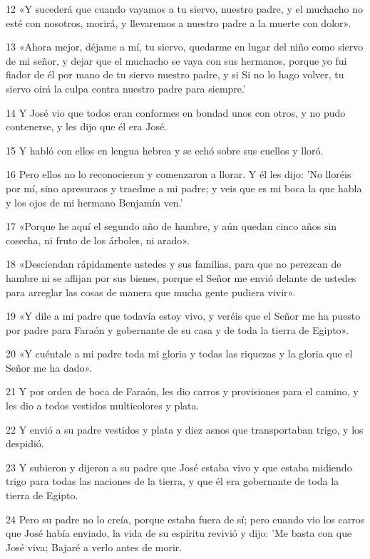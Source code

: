 \par 12 «Y sucederá que cuando vayamos a tu siervo, nuestro padre, y el muchacho no esté con nosotros, morirá, y llevaremos a nuestro padre a la muerte con dolor».
\par 13 «Ahora mejor, déjame a mí, tu siervo, quedarme en lugar del niño como siervo de mi señor, y dejar que el muchacho se vaya con sus hermanos, porque yo fui fiador de él por mano de tu siervo nuestro padre, y si Si no lo hago volver, tu siervo oirá la culpa contra nuestro padre para siempre.'
\par 14 Y José vio que todos eran conformes en bondad unos con otros, y no pudo contenerse, y les dijo que él era José.
\par 15 Y habló con ellos en lengua hebrea y se echó sobre sus cuellos y lloró.
\par 16 Pero ellos no lo reconocieron y comenzaron a llorar. Y él les dijo: 'No lloréis por mí, sino apresuraos y traedme a mi padre; y veis que es mi boca la que habla y los ojos de mi hermano Benjamín ven.'
\par 17 «Porque he aquí el segundo año de hambre, y aún quedan cinco años sin cosecha, ni fruto de los árboles, ni arado».
\par 18 «Desciendan rápidamente ustedes y sus familias, para que no perezcan de hambre ni se aflijan por sus bienes, porque el Señor me envió delante de ustedes para arreglar las cosas de manera que mucha gente pudiera vivir».
\par 19 «Y dile a mi padre que todavía estoy vivo, y veréis que el Señor me ha puesto por padre para Faraón y gobernante de su casa y de toda la tierra de Egipto».
\par 20 «Y cuéntale a mi padre toda mi gloria y todas las riquezas y la gloria que el Señor me ha dado».
\par 21 Y por orden de boca de Faraón, les dio carros y provisiones para el camino, y les dio a todos vestidos multicolores y plata.
\par 22 Y envió a su padre vestidos y plata y diez asnos que transportaban trigo, y los despidió.
\par 23 Y subieron y dijeron a su padre que José estaba vivo y que estaba midiendo trigo para todas las naciones de la tierra, y que él era gobernante de toda la tierra de Egipto.
\par 24 Pero su padre no lo creía, porque estaba fuera de sí; pero cuando vio los carros que José había enviado, la vida de su espíritu revivió y dijo: 'Me basta con que José viva; Bajaré a verlo antes de morir.

